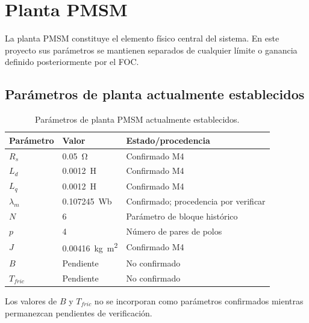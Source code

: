\section{Planta PMSM}

La planta PMSM constituye el elemento físico central del sistema. En este proyecto sus parámetros se mantienen separados de cualquier límite o ganancia definido posteriormente por el FOC.

\subsection{Parámetros de planta actualmente establecidos}

\begin{table}[H]
\centering
\caption{Parámetros de planta PMSM actualmente establecidos.}
\label{tab:plant_params}
\begin{tabular}{lll}
\toprule
Parámetro & Valor & Estado/procedencia \\
\midrule
$R_s$ & \SI{0.05}{\ohm} & Confirmado M4 \\
$L_d$ & \SI{0.0012}{H} & Confirmado M4 \\
$L_q$ & \SI{0.0012}{H} & Confirmado M4 \\
$\lambda_m$ & \SI{0.107245}{Wb} & Confirmado; procedencia por verificar \\
$N$ & 6 & Parámetro de bloque histórico \\
$p$ & 4 & Número de pares de polos \\
$J$ & \SI{0.00416}{kg.m^2} & Confirmado M4 \\
$B$ & Pendiente & No confirmado \\
$T_{fric}$ & Pendiente & No confirmado \\
\bottomrule
\end{tabular}
\end{table}

Los valores de $B$ y $T_{fric}$ no se incorporan como parámetros confirmados mientras permanezcan pendientes de verificación.
